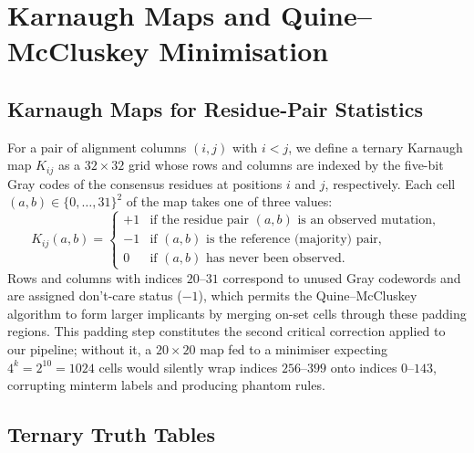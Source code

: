 \section{Karnaugh Maps and Quine--McCluskey Minimisation}
\label{sec:theory-kmap-qm}

\subsection{Karnaugh Maps for Residue-Pair Statistics}
\label{sec:kmap-construction}

For a pair of alignment columns $(i, j)$ with $i < j$, we define a ternary
Karnaugh map $K_{ij}$ as a $32 \times 32$ grid whose rows and columns are
indexed by the five-bit Gray codes of the consensus residues at positions $i$
and $j$, respectively.  Each cell $(a, b) \in \{0,\ldots,31\}^2$ of the map
takes one of three values:
\begin{equation}
	K_{ij}(a, b) =
	\begin{cases}
		+1 & \text{if the residue pair } (a, b) \text{ is an observed mutation}, \\
		-1 & \text{if } (a, b) \text{ is the reference (majority) pair},         \\
		0  & \text{if } (a, b) \text{ has never been observed}.
	\end{cases}
	\label{eq:kmap-def}
\end{equation}
Rows and columns with indices $20$--$31$ correspond to unused Gray codewords
and are assigned don't-care status ($-1$), which permits the
Quine--McCluskey algorithm to form larger implicants by merging on-set cells
through these padding regions.  This padding step constitutes the second
critical correction applied to our pipeline; without it, a $20 \times 20$
map fed to a minimiser expecting $4^k = 2^{10} = 1024$ cells would silently
wrap indices $256$--$399$ onto indices $0$--$143$, corrupting minterm labels
and producing phantom rules.

\subsection{Ternary Truth Tables}
\label{sec:truth-tables}

